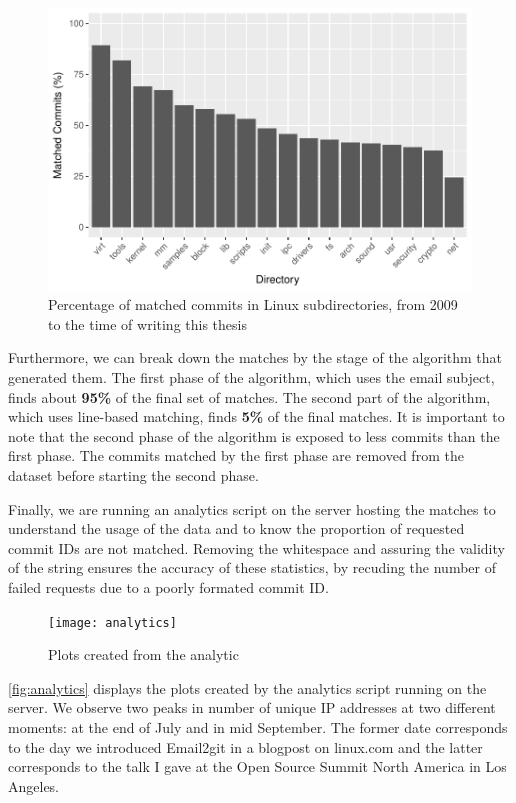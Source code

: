 \begin{figure}[htb]
\centering
\includegraphics[width=5in]{plots/matched_commits_dir}
\caption{Percentage of matched commits in Linux subdirectories, from 2009 to the time of writing this thesis}
\label{fig:matched_proportions}
\end{figure}

Furthermore, we can break down the matches by the stage of the algorithm that generated them. The first phase of the algorithm, which uses the email subject, finds about \textbf{95\%} of the final set of matches. The second part of the algorithm, which uses line-based matching, finds \textbf{5\%} of the final matches. It is important to note that the second phase of the algorithm is exposed to less commits than the first phase. The commits matched by the first phase are removed from the dataset before starting the second phase.



Finally, we are running an analytics script on the server hosting the matches to understand the usage of the data and to know the proportion of requested commit IDs are not matched. Removing the whitespace and assuring the validity of the string ensures the accuracy of these statistics, by recuding the number of failed requests due to a poorly formated commit ID.

\begin{figure}[htb]
\centering
\texttt{[image: analytics]}
\caption{Plots created from the analytic}
\label{fig:analytics}
\end{figure}

\autoref{fig:analytics} displays the plots created by the analytics script running on the server. We observe two peaks in number of unique IP addresses at two different moments: at the end of July and in mid September. The former date corresponds to the day we introduced Email2git in a blogpost on linux.com and the latter corresponds to the talk I gave at the Open Source Summit North America in Los Angeles. 


